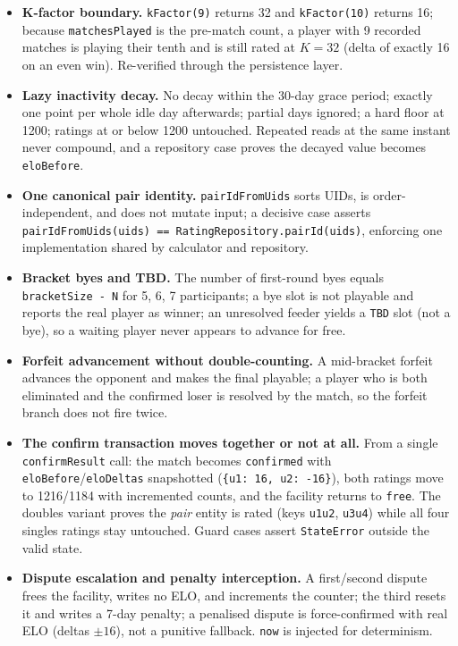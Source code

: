 \documentclass{configurations/polimi3i_thesis}
\renewcommand{\_}{\textunderscore\allowbreak}
\begin{document}
\begin{itemize}
    \item \textbf{K-factor boundary.} \texttt{kFactor(9)} returns 32 and \texttt{kFactor(10)} returns 16; because \texttt{matchesPlayed} is the pre-match count, a player with 9 recorded matches is playing their tenth and is still rated at $K=32$ (delta of exactly 16 on an even win). Re-verified through the persistence layer.
    \item \textbf{Lazy inactivity decay.} No decay within the 30-day grace period; exactly one point per whole idle day afterwards; partial days ignored; a hard floor at 1200; ratings at or below 1200 untouched. Repeated reads at the same instant never compound, and a repository case proves the decayed value becomes \texttt{eloBefore}.
    \item \textbf{One canonical pair identity.} \texttt{pairIdFromUids} sorts UIDs, is order-independent, and does not mutate input; a decisive case asserts \texttt{pairIdFromUids(uids) == RatingRepository.pairId(uids)}, enforcing one implementation shared by calculator and repository.
    \item \textbf{Bracket byes and TBD.} The number of first-round byes equals \texttt{bracketSize - N} for 5, 6, 7 participants; a bye slot is not playable and reports the real player as winner; an unresolved feeder yields a \texttt{TBD} slot (not a bye), so a waiting player never appears to advance for free.
    \item \textbf{Forfeit advancement without double-counting.} A mid-bracket forfeit advances the opponent and makes the final playable; a player who is both eliminated and the confirmed loser is resolved by the match, so the forfeit branch does not fire twice.
    \item \textbf{The confirm transaction moves together or not at all.} From a single \texttt{confirmResult} call: the match becomes \texttt{confirmed} with \texttt{eloBefore}/\texttt{eloDeltas} snapshotted (\texttt{\{u1: 16, u2: -16\}}), both ratings move to 1216/1184 with incremented counts, and the facility returns to \texttt{free}. The doubles variant proves the \emph{pair} entity is rated (keys \texttt{u1\_u2}, \texttt{u3\_u4}) while all four singles ratings stay untouched. Guard cases assert \texttt{StateError} outside the valid state.
    \item \textbf{Dispute escalation and penalty interception.} A first/second dispute frees the facility, writes no ELO, and increments the counter; the third resets it and writes a 7-day penalty; a penalised dispute is force-confirmed with real ELO (deltas $\pm 16$), not a punitive fallback. \texttt{now} is injected for determinism.

\end{itemize}
\end{document}
